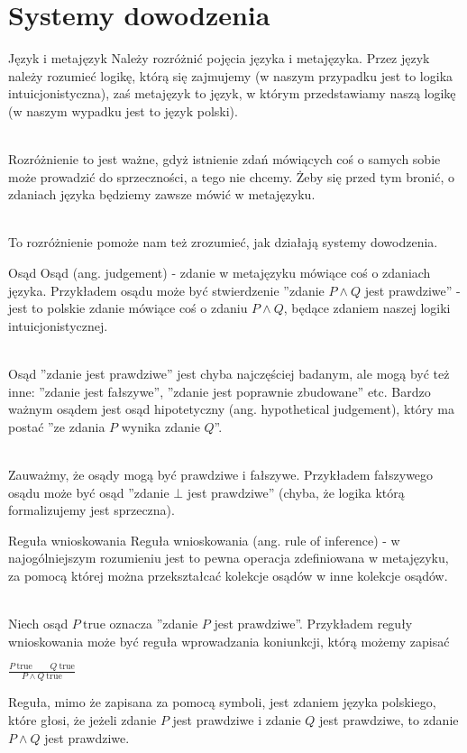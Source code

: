 \documentclass{beamer}
\begin{document}
\section{Systemy dowodzenia}

\begin{frame}{Język i metajęzyk}
Należy rozróżnić pojęcia języka i metajęzyka. Przez język należy rozumieć logikę, którą się zajmujemy (w naszym przypadku jest to logika intuicjonistyczna), zaś metajęzyk to język, w którym przedstawiamy naszą logikę (w naszym wypadku jest to język polski). \\~\

Rozróżnienie to jest ważne, gdyż istnienie zdań mówiących coś o samych sobie może prowadzić do sprzeczności, a tego nie chcemy. Żeby się przed tym bronić, o zdaniach języka będziemy zawsze mówić w metajęzyku. \\~\

To rozróżnienie pomoże nam też zrozumieć, jak działają systemy dowodzenia.
\end{frame}

\begin{frame}{Osąd}
	Osąd (ang. judgement) - zdanie w metajęzyku mówiące coś o zdaniach języka. Przykładem osądu może być stwierdzenie ''zdanie $P \land Q$ jest prawdziwe'' - jest to polskie zdanie mówiące coś o zdaniu $P \land Q$, będące zdaniem naszej logiki intuicjonistycznej. \\~\
	
	Osąd ''zdanie jest prawdziwe'' jest chyba najczęściej badanym, ale mogą być też inne: ''zdanie jest fałszywe'', ''zdanie jest poprawnie zbudowane'' etc. Bardzo ważnym osądem jest osąd hipotetyczny (ang. hypothetical judgement), który ma postać ''ze zdania $P$ wynika zdanie $Q$''. \\~\
	
	Zauważmy, że osądy mogą być prawdziwe i fałszywe. Przykładem fałszywego osądu może być osąd ''zdanie $\bot$ jest prawdziwe'' (chyba, że logika którą formalizujemy jest sprzeczna).
\end{frame}

\begin{frame}{Reguła wnioskowania}
	Reguła wnioskowania (ang. rule of inference) - w najogólniejszym rozumieniu jest to pewna operacja zdefiniowana w metajęzyku, za pomocą której można przekształcać kolekcje osądów w inne kolekcje osądów. \\~\
	
	Niech osąd $P \ \text{true}$ oznacza ''zdanie $P$ jest prawdziwe''. Przykładem reguły wnioskowania może być reguła wprowadzania koniunkcji, którą możemy zapisać \\

	\begin{center}
		$\displaystyle \frac{P \ \text{true} \qquad Q \ \text{true}}{P \land Q \ \text{true}}$
	\end{center}
	
	Reguła, mimo że zapisana za pomocą symboli, jest zdaniem języka polskiego, które głosi, że jeżeli zdanie $P$ jest prawdziwe i zdanie $Q$ jest prawdziwe, to zdanie $P \land Q$ jest prawdziwe.
\end{frame}
\end{document}
